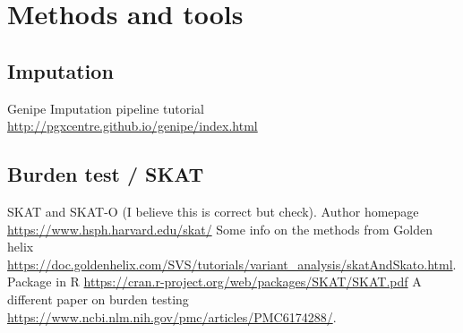 \pagestyle{myheadings}

\chapter{Methods and tools}
\section{Imputation}
Genipe Imputation pipeline tutorial
\url{http://pgxcentre.github.io/genipe/index.html}

\section{Burden test / SKAT}
SKAT 
\citet{Lee2012Optimal}
and SKAT-O 
\citet{Lee2012Optimalunified} (I believe this is correct but check).
Author homepage
\url{https://www.hsph.harvard.edu/skat/}
Some info on the methods from Golden helix 
\url{https://doc.goldenhelix.com/SVS/tutorials/variant_analysis/skatAndSkato.html}.
Package in R 
\url{https://cran.r-project.org/web/packages/SKAT/SKAT.pdf}
A different paper on burden testing
\url{https://www.ncbi.nlm.nih.gov/pmc/articles/PMC6174288/}.

\section{}



